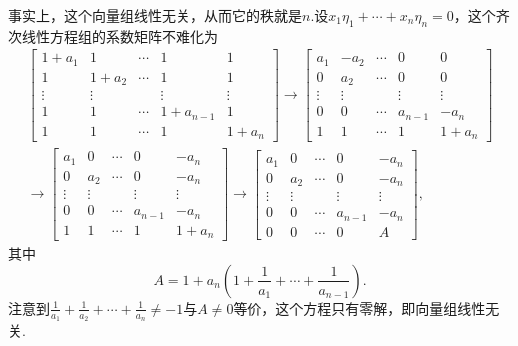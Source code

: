 \begin{sol}[法一]
	事实上，这个向量组线性无关，从而它的秩就是$n$.设$x_1\eta_1+\cdots+x_n\eta_n=0$，这个齐次线性方程组的系数矩阵不难化为
	\begin{gather*}
		\begin{bmatrix}
			1+a_1  & 1      & \cdots & 1         & 1      \\
			1      & 1+a_2  & \cdots & 1         & 1      \\
			\vdots & \vdots &        & \vdots    & \vdots \\
			1      & 1      & \cdots & 1+a_{n-1} & 1      \\
			1      & 1      & \cdots & 1         & 1+a_n
		\end{bmatrix}\longrightarrow
		\begin{bmatrix}
			a_1    & -a_2   & \cdots & 0       & 0      \\
			0      & a_2    & \cdots & 0       & 0      \\
			\vdots & \vdots &        & \vdots  & \vdots \\
			0      & 0      & \cdots & a_{n-1} & -a_n   \\
			1      & 1      & \cdots & 1       & 1+a_n
		\end{bmatrix}\\\longrightarrow
		\begin{bmatrix}
			a_1    & 0      & \cdots & 0       & -a_n   \\
			0      & a_2    & \cdots & 0       & -a_n   \\
			\vdots & \vdots &        & \vdots  & \vdots \\
			0      & 0      & \cdots & a_{n-1} & -a_n   \\
			1      & 1      & \cdots & 1       & 1+a_n
		\end{bmatrix}\longrightarrow
		\begin{bmatrix}
			a_1    & 0      & \cdots & 0       & -a_n   \\
			0      & a_2    & \cdots & 0       & -a_n   \\
			\vdots & \vdots &        & \vdots  & \vdots \\
			0      & 0      & \cdots & a_{n-1} & -a_n   \\
			0      & 0      & \cdots & 0       & A
		\end{bmatrix},
	\end{gather*}
	其中
	\[
		A=1+a_n\left(1+\frac{1}{a_1}+\cdots+\frac{1}{a_{n-1}}\right).
	\]
	注意到$\frac{1}{a_1}+\frac{1}{a_2}+\cdots+\frac{1}{a_n}\ne-1$与$A\ne0$等价，这个方程只有零解，即向量组线性无关.
\end{sol}
